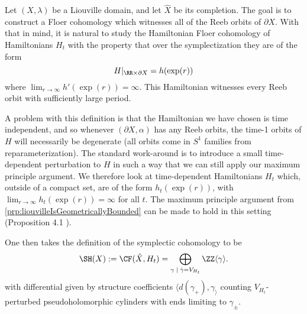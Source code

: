 

   \label{con:symplecticCohomologyQuadratic}
   Let $(X, \lambda)$ be a Liouville domain, and let $\hat X$ be its completion. The goal is to construct a Floer cohomology which witnesses all of the Reeb orbits of $\partial X$. With that in mind, it is natural to study the Hamiltonian Floer cohomology of Hamiltonians $H_t$ with the property that over the symplectization they are of the form 
   \[H|_{\RR\times \partial X}=h(\exp(r))\]
   where $\lim_{r\to\infty} h'(\exp(r))=\infty$. This Hamiltonian witnesses every Reeb orbit with sufficiently large period. 
   
   
   A problem with this definition is that the Hamiltonian we have chosen is time independent, and so whenever $(\partial X, \alpha)$ has any Reeb orbits, the time-1 orbits of $H$ will necessarily be degenerate (all orbits come in $S^1$ families from reparameterization). The standard work-around is to introduce a small time-dependent perturbation to $H$ in such a way that we can still apply our maximum principle argument. We therefore look at time-dependent Hamiltonians $H_t$ which, outside of a compact set, are of the form $h_t(\exp(r))$, with $\lim_{r\to\infty} h_t(\exp(r))=\infty$ for all $t$. The maximum principle argument from \cref{prp:liouvilleIsGeometricallyBounded} can be made to hold in this setting (Proposition 4.1 \cite{wendlbeginner}).

   One then takes the definition of the symplectic cohomology to be 
   \[\SH(X):=\CF(\hat X, H_t)=\bigoplus_{\gamma\;|\; \dot \gamma= V_{H_t}} \ZZ\langle \gamma\rangle.\]
   with differential given by structure coefficients $\langle d(\gamma_+), \gamma_\rangle$ counting $V_{H_t}$-perturbed pseudoholomorphic cylinders with ends limiting to $\gamma_\pm$.
